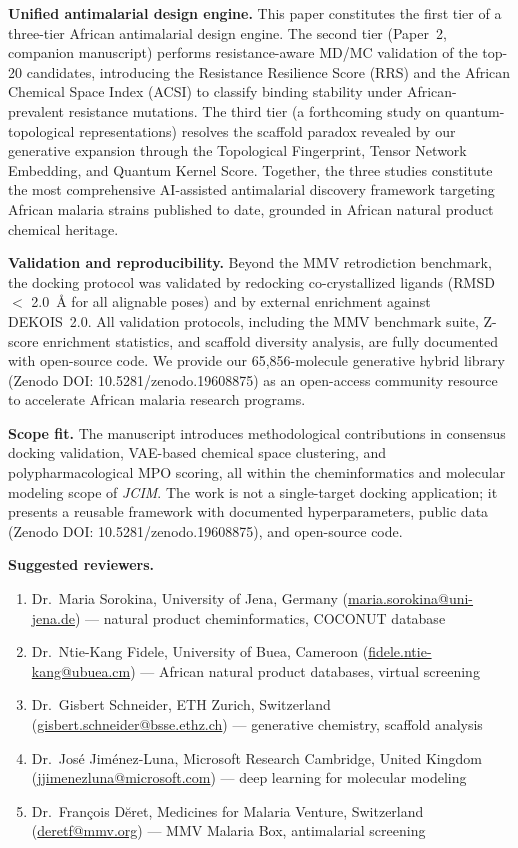 \documentclass[11pt,letterpaper]{article}
\begin{document}
\textbf{Unified antimalarial design engine.} This paper constitutes the first tier of a three-tier African antimalarial design engine. The second tier (Paper~2, companion manuscript) performs resistance-aware MD/MC validation of the top-20 candidates, introducing the Resistance Resilience Score (RRS) and the African Chemical Space Index (ACSI) to classify binding stability under African-prevalent resistance mutations. The third tier (a forthcoming study on quantum-topological representations) resolves the scaffold paradox revealed by our generative expansion through the Topological Fingerprint, Tensor Network Embedding, and Quantum Kernel Score. Together, the three studies constitute the most comprehensive AI-assisted antimalarial discovery framework targeting African malaria strains published to date, grounded in African natural product chemical heritage.

\textbf{Validation and reproducibility.} Beyond the MMV retrodiction benchmark, the docking protocol was validated by redocking co-crystallized ligands (RMSD $<$ \qty{2.0}{\angstrom} for all alignable poses) and by external enrichment against DEKOIS~2.0. All validation protocols, including the MMV benchmark suite, Z-score enrichment statistics, and scaffold diversity analysis, are fully documented with open-source code. We provide our 65,856-molecule generative hybrid library (Zenodo DOI: 10.5281/zenodo.19608875) as an open-access community resource to accelerate African malaria research programs.

\textbf{Scope fit.} The manuscript introduces methodological contributions in consensus docking validation, VAE-based chemical space clustering, and polypharmacological MPO scoring, all within the cheminformatics and molecular modeling scope of \textit{JCIM}. The work is not a single-target docking application; it presents a reusable framework with documented hyperparameters, public data (Zenodo DOI: 10.5281/zenodo.19608875), and open-source code.

\textbf{Suggested reviewers.}
\begin{enumerate}
    \item Dr.\ Maria Sorokina, University of Jena, Germany (\href{mailto:maria.sorokina@uni-jena.de}{maria.sorokina@uni-jena.de}) — natural product cheminformatics, COCONUT database
    \item Dr.\ Ntie-Kang Fidele, University of Buea, Cameroon (\href{mailto:fidele.ntie-kang@ubuea.cm}{fidele.ntie-kang@ubuea.cm}) — African natural product databases, virtual screening
    \item Dr.\ Gisbert Schneider, ETH Zurich, Switzerland (\href{mailto:gisbert.schneider@bsse.ethz.ch}{gisbert.schneider@bsse.ethz.ch}) — generative chemistry, scaffold analysis
    \item Dr.\ José Jiménez-Luna, Microsoft Research Cambridge, United Kingdom (\href{mailto:jjimenezluna@microsoft.com}{jjimenezluna@microsoft.com}) — deep learning for molecular modeling
    \item Dr.\ Fran\c{c}ois D\u{e}ret, Medicines for Malaria Venture, Switzerland (\href{mailto:deretf@mmv.org}{deretf@mmv.org}) — MMV Malaria Box, antimalarial screening
\end{enumerate}
\end{document}

